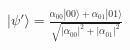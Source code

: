 \documentclass[preview]{standalone}
\begin{document}
\begin{align*}
|\psi'\rangle = \frac {\alpha_{00 } |00\rangle +  \alpha_{01 }|01\rangle}{\sqrt{|\alpha_{00}|^2 + |\alpha_{01}|^2}}
\end{align*}
\end{document}
